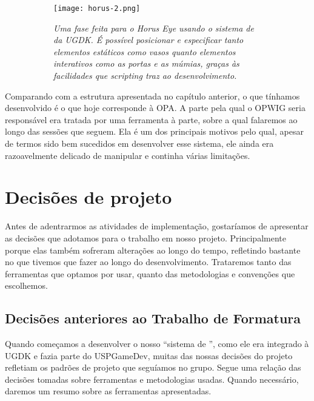     \begin{figure}[ht]
      \centering
      \caption{}
      \begin{subfigure}{.8\textwidth}
        \begin{center}
          \texttt{[image: horus-2.png]}
          \vspace{1em}

          \textit{
            Uma fase feita para o \emph{Horus Eye} usando o sistema de 
            da UGDK. É possível posicionar e especificar tanto elementos estáticos
            como vasos quanto elementos interativos como as portas e as múmias,
            graças às facilidades que \emph{scripting} traz ao desenvolvimento.
          }
        \end{center}
      \end{subfigure}
      \label{fig:horus}
    \end{figure}

    Comparando com a estrutura apresentada no capítulo anterior, o que tínhamos
    desenvolvido é o que hoje corresponde à OPA. A parte pela qual o OPWIG seria
    responsável era tratada por uma ferramenta à parte, sobre a qual falaremos ao
    longo das sessões que seguem. Ela é um dos principais motivos pelo qual, apesar
    de termos sido bem sucedidos em desenvolver esse sistema, ele ainda era
    razoavelmente delicado de manipular e continha várias limitações.

  \section{Decisões de projeto}
  \label{sec:actividads:decisoes}

  Antes de adentrarmos as atividades de implementação, gostaríamos de apresentar
  as decisões que adotamos para o trabalho em nosso projeto. Principalmente
  porque elas também sofreram alterações ao longo do tempo, refletindo bastante
  no que tivemos que fazer ao longo do desenvolvimento. Trataremos tanto das
  ferramentas que optamos por usar, quanto das metodologias e convenções que
  escolhemos.

  \subsection{Decisões anteriores ao Trabalho de Formatura}
  Quando começamos a desenvolver o nosso ``sistema de '',
  como ele era integrado à UGDK e fazia parte do USPGameDev, muitas das
  nossas decisões do projeto refletiam os padrões de projeto que seguíamos
  no grupo. Segue uma relação das decisões tomadas sobre ferramentas e
  metodologias usadas. Quando necessário, daremos um resumo sobre as
  ferramentas apresentadas.

